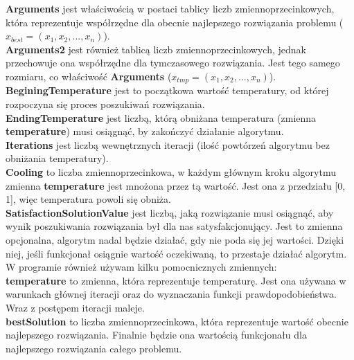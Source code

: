 \documentclass[twoside]{projektInzynierskiMS1}
\newcommand{\si}{ś}
\begin{document}
\textbf{Arguments} jest wła\si ciwo\si cią w postaci tablicy liczb zmiennoprzecinkowych, która reprezentuje współrzędne dla obecnie najlepszego rozwiązania problemu ($x_{best} = (x_1, x_2, ..., x_n)$). \\

\textbf{Arguments2} jest również tablicą liczb zmiennoprzecinkowych, jednak przechowuje ona współrzędne dla tymczasowego rozwiązania. Jest tego samego rozmiaru, co wła\si ciwo\si ć \textbf{Arguments} ($x_{tmp} = (x_1, x_2, ..., x_n)$). \\

\textbf{BeginingTemperature} jest to początkowa warto\si ć temperatury, od której rozpoczyna się proces poszukiwań rozwiązania. \\ 

\textbf{EndingTemperature} jest liczbą, którą obniżana temperatura (zmienna \textbf{temperature}) musi osiągnąć, by zakończyć działanie algorytmu. \\

\textbf{Iterations} jest liczbą wewnętrznych iteracji (ilo\si ć powtórzeń algorytmu bez obniżania temperatury). \\

\textbf{Cooling} to liczba zmiennoprzecinkowa, w każdym głównym kroku algorytmu zmienna \textbf{temperature} jest mnożona przez tą warto\si ć. Jest ona z przedziału [0, 1], więc temperatura powoli się obniża. \\

\textbf{SatisfactionSolutionValue} jest liczbą, jaką rozwiązanie musi osiągnąć, aby wynik poszukiwania rozwiązania był dla nas satysfakcjonujący. Jest to zmienna opcjonalna, algorytm nadal będzie działać, gdy nie poda się jej warto\si ci. Dzięki niej, je\si li funkcjonał osiągnie warto\si ć oczekiwaną, to przestaje działać algorytm.\\

W programie również używam kilku pomocnicznych zmiennych: \\

\textbf{temperature} to zmienna, która reprezentuje temperaturę. Jest ona używana w warunkach głównej iteracji oraz do wyznaczania funkcji prawdopodobieństwa. Wraz z postępem iteracji maleje. \\

\textbf{bestSolution} to liczba zmiennoprzecinkowa, która reprezentuje warto\si ć obecnie najlepszego rozwiązania. Finalnie będzie ona warto\si cią funkcjonału dla najlepszego rozwiązania całego problemu. \\
\end{document}
